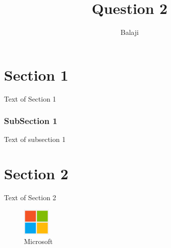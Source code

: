 \documentclass{report}
\begin{document}
    \title{Question 2}
    \author{Balaji}

    \maketitle

    \tableofcontents

    \chapter{Section 1}
	Text of Section 1
	\subsection{SubSection 1}
	Text of subsection 1
	\chapter{Section 2}
	Text of Section 2
    \begin{figure}[h]
        \includegraphics[width=50px]{Microsoft_logo.png}
        \centering
        \caption{Microsoft}
    \end{figure}
\end{document}
